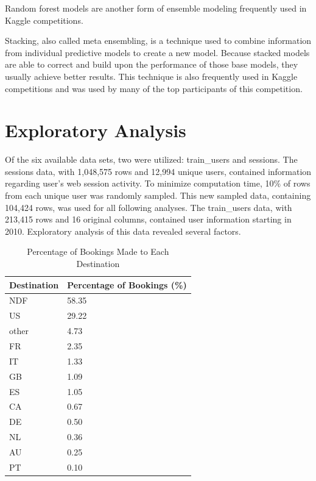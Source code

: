 \documentclass{article}
\begin{document}
Random forest models are another form of ensemble modeling frequently used in Kaggle competitions. 

Stacking, also called meta ensembling, is a technique used to combine information from individual predictive 
models to create a new model. Because stacked models are able to correct and build upon the performance of those
base models, they usually achieve better results. This technique is also frequently used in Kaggle competitions
and was used by many of the top participants of this competition. 


\section{Exploratory Analysis}

Of the six available data sets, two were utilized: train\_users and sessions. The sessions data, with 1,048,575 rows and 12,994 unique users, contained information regarding user's web session activity. To minimize computation time, 10\% of rows from each unique user was randomly sampled. This new sampled data, containing 104,424 rows, was used for all following analyses. The train\_users data, with 213,415 rows and 16 original columns, contained user information starting in 2010. Exploratory analysis of this data revealed several factors. 

\begin{table}[ht]
\centering
\begin{tabular}{| l |l |}
  \hline
  \textbf{Destination} & \textbf{Percentage of Bookings (\%)} \\ 
  \hline
  NDF & 58.35 \\ 
  US & 29.22 \\ 
  other & 4.73 \\ 
  FR & 2.35 \\ 
  IT & 1.33 \\ 
  GB & 1.09 \\ 
  ES & 1.05 \\ 
  CA & 0.67 \\ 
  DE & 0.50 \\ 
  NL & 0.36 \\ 
  AU & 0.25 \\ 
  PT & 0.10 \\ 
   \hline
\end{tabular}
\caption{Percentage of Bookings Made to Each Destination}
\label{table:countries}
\end{table}
\end{document}
